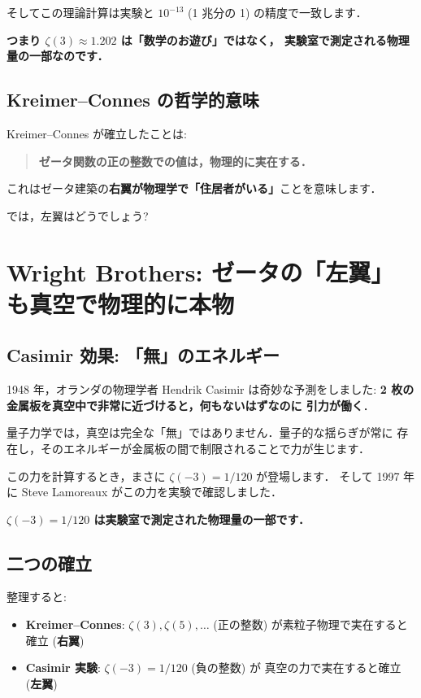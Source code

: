 \documentclass[11pt,a4paper]{article}
\begin{document}
そしてこの理論計算は実験と $10^{-13}$ (1 兆分の 1) の精度で一致します．

\textbf{つまり $\zeta(3) \approx 1.202$ は「数学のお遊び」ではなく，
実験室で測定される物理量の一部なのです．}

\subsection{Kreimer--Connes の哲学的意味}

Kreimer--Connes が確立したことは:
\begin{quote}
\textbf{ゼータ関数の正の整数での値は，物理的に実在する．}
\end{quote}
これはゼータ建築の\textbf{右翼が物理学で「住居者がいる」}ことを意味します．

では，左翼はどうでしょう?

\section{Wright Brothers: ゼータの「左翼」も真空で物理的に本物}

\subsection{Casimir 効果: 「無」のエネルギー}

1948 年，オランダの物理学者 Hendrik Casimir は奇妙な予測をしました:
\textbf{2 枚の金属板を真空中で非常に近づけると，何もないはずなのに
引力が働く}．

量子力学では，真空は完全な「無」ではありません．量子的な揺らぎが常に
存在し，そのエネルギーが金属板の間で制限されることで力が生じます．

この力を計算するとき，まさに $\zeta(-3) = 1/120$ が登場します．
そして 1997 年に Steve Lamoreaux がこの力を実験で確認しました．

\textbf{$\zeta(-3) = 1/120$ は実験室で測定された物理量の一部です．}

\subsection{二つの確立}

整理すると:
\begin{itemize}
\item \textbf{Kreimer--Connes}: $\zeta(3), \zeta(5), \ldots$
  (正の整数) が素粒子物理で実在すると確立 (\textbf{右翼})
\item \textbf{Casimir 実験}: $\zeta(-3) = 1/120$ (負の整数) が
  真空の力で実在すると確立 (\textbf{左翼})
\end{itemize}
\end{document}
